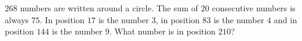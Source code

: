 \documentclass[varwidth]{standalone}
\begin{document}
    $268$ numbers are written around a circle. The sum of $20$ consecutive numbers is always $75$. In position $17$ is the number $3$, in position $83$ is the number $4$ and in position $144$ is the number $9$. What number is in position $210$?
\end{document}
